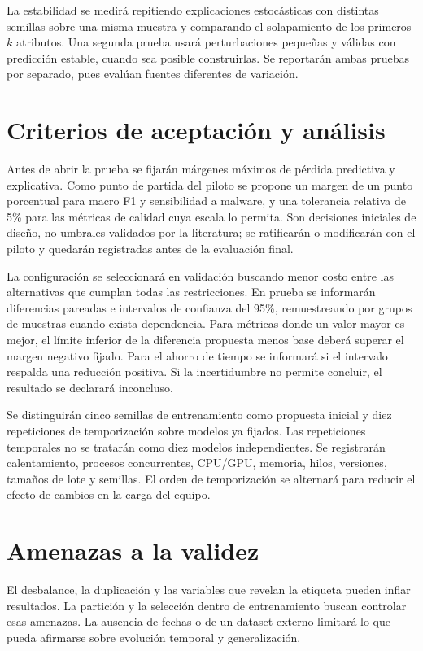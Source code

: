 La estabilidad se medirá repitiendo explicaciones estocásticas con distintas semillas sobre una misma muestra y comparando el solapamiento de los primeros $k$ atributos. Una segunda prueba usará perturbaciones pequeñas y válidas con predicción estable, cuando sea posible construirlas. Se reportarán ambas pruebas por separado, pues evalúan fuentes diferentes de variación.

\section{Criterios de aceptación y análisis}
Antes de abrir la prueba se fijarán márgenes máximos de pérdida predictiva y explicativa. Como punto de partida del piloto se propone un margen de un punto porcentual para macro F1 y sensibilidad a malware, y una tolerancia relativa de 5\% para las métricas de calidad cuya escala lo permita. Son decisiones iniciales de diseño, no umbrales validados por la literatura; se ratificarán o modificarán con el piloto y quedarán registradas antes de la evaluación final.

La configuración se seleccionará en validación buscando menor costo entre las alternativas que cumplan todas las restricciones. En prueba se informarán diferencias pareadas e intervalos de confianza del 95\%, remuestreando por grupos de muestras cuando exista dependencia. Para métricas donde un valor mayor es mejor, el límite inferior de la diferencia propuesta menos base deberá superar el margen negativo fijado. Para el ahorro de tiempo se informará si el intervalo respalda una reducción positiva. Si la incertidumbre no permite concluir, el resultado se declarará inconcluso.

Se distinguirán cinco semillas de entrenamiento como propuesta inicial y diez repeticiones de temporización sobre modelos ya fijados. Las repeticiones temporales no se tratarán como diez modelos independientes. Se registrarán calentamiento, procesos concurrentes, CPU/GPU, memoria, hilos, versiones, tamaños de lote y semillas. El orden de temporización se alternará para reducir el efecto de cambios en la carga del equipo.

\section{Amenazas a la validez}
El desbalance, la duplicación y las variables que revelan la etiqueta pueden inflar resultados. La partición y la selección dentro de entrenamiento buscan controlar esas amenazas. La ausencia de fechas o de un dataset externo limitará lo que pueda afirmarse sobre evolución temporal y generalización.

